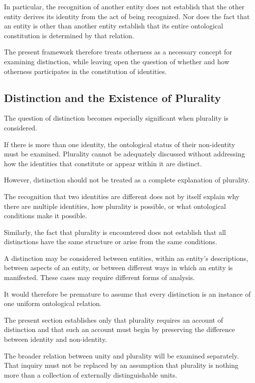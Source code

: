 In particular, the recognition of another entity does not
establish that the other entity derives its identity from
the act of being recognized. Nor does the fact that an entity
is other than another entity establish that its entire
ontological constitution is determined by that relation.

The present framework therefore treats otherness as a
necessary concept for examining distinction, while leaving
open the question of whether and how otherness participates
in the constitution of identities.

\subsection{Distinction and the Existence of Plurality}

The question of distinction becomes especially significant
when plurality is considered.

If there is more than one identity, the ontological status
of their non-identity must be examined. Plurality cannot
be adequately discussed without addressing how the identities
that constitute or appear within it are distinct.

However, distinction should not be treated as a complete
explanation of plurality.

The recognition that two identities are different does
not by itself explain why there are multiple identities,
how plurality is possible, or what ontological conditions
make it possible.

Similarly, the fact that plurality is encountered does
not establish that all distinctions have the same structure
or arise from the same conditions.

A distinction may be considered between entities, within
an entity's descriptions, between aspects of an entity,
or between different ways in which an entity is manifested.
These cases may require different forms of analysis.

It would therefore be premature to assume that every
distinction is an instance of one uniform ontological
relation.

The present section establishes only that plurality
requires an account of distinction and that such an account
must begin by preserving the difference between identity
and non-identity.

The broader relation between unity and plurality will
be examined separately. That inquiry must not be replaced
by an assumption that plurality is nothing more than
a collection of externally distinguishable units.

